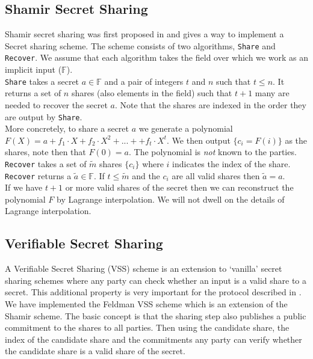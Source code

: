 \documentclass[ %
                    author={Nicholas Tutte},
                supervisor={Prof. Nigel Smart},
                    degree={MEng},
                     title={Secure Two Party Computation},
                  subtitle={A practical comparison of recent protocols},
                      type={Research - GG1K},
                      year={2015} ]{dissertation}
\begin{document}
			\subsection{Shamir Secret Sharing}
				Shamir secret sharing was first proposed in \cite{ShamirSecretSharing} and gives a way to implement a Secret sharing scheme. The scheme consists of two algorithms, \texttt{Share} and \texttt{Recover}. We assume that each algorithm takes the field over which we work as an implicit input ($\mathbb{F}$).\\

				\texttt{Share} takes a secret $a \in \mathbb{F}$ and a pair of integers $t$ and $n$ such that $t \leq n$. It returns a set of $n$ shares (also elements in the field) such that $t + 1$ many are needed to recover the secret $a$. Note that the shares are indexed in the order they are output by \texttt{Share}.\\

				More concretely, to share a secret $a$ we generate a polynomial $F(X) = a + f_1 \cdot X + f_2 \cdot X^2 + ... +  + f_t \cdot X ^ t$. We then output $\{c_i = F(i)\}$ as the shares, note then that $F(0) = a$. The polynomial is \emph{not} known to the parties.\\

				\texttt{Recover} takes a set of $\tilde m$ shares $\{c_i\}$ where $i$ indicates the index of the share. \texttt{Recover} returns a $ \tilde a \in \mathbb{F}$. If $t \leq \tilde m$ and the $c_i$ are all valid shares then $\tilde a = a$.\\

				If we have $t + 1$ or more valid shares of the secret then we can reconstruct the polynomial $F$ by Lagrange interpolation. We will not dwell on the details of Lagrange interpolation.\\

			\subsection{Verifiable Secret Sharing}

				A Verifiable Secret Sharing (VSS) scheme is an extension to `vanilla' secret sharing schemes where any party can check whether an input is a valid share to a secret. This additional property is very important for the protocol described in \cite{Katz_Symm_CnC_2013}.\\

				We have implemented the Feldman VSS scheme which is an extension of the Shamir scheme. The basic concept is that the sharing step also publishes a public commitment to the shares to all parties. Then using the candidate share, the index of the  candidate share and the commitments any party can verify whether the candidate share is a valid share of the secret.
\end{document}
